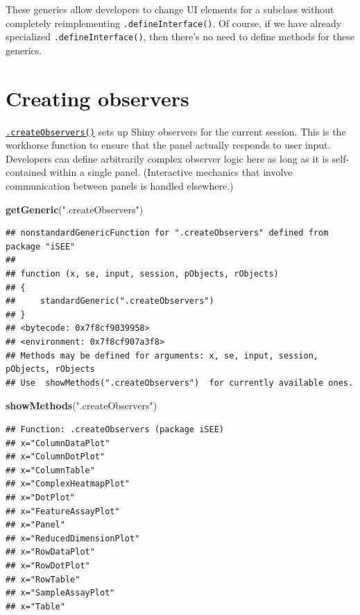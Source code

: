 \documentclass[
]{book}
\newenvironment{Shaded}{\begin{snugshade}}{\end{snugshade}}
\newcommand{\KeywordTok}[1]{\textcolor[rgb]{0.13,0.29,0.53}{\textbf{#1}}}
\newcommand{\NormalTok}[1]{#1}
\newcommand{\StringTok}[1]{\textcolor[rgb]{0.31,0.60,0.02}{#1}}
\begin{document}
These generics allow developers to change UI elements for a subclass without completely reimplementing \texttt{.defineInterface()}.
Of course, if we have already specialized \texttt{.defineInterface()}, then there's no need to define methods for these generics.

\hypertarget{creating-observers}{%
\section{Creating observers}\label{creating-observers}}

\href{https://isee.github.io/iSEE/reference/observer-generics.html}{\texttt{.createObservers()}} sets up Shiny observers for the current session.
This is the workhorse function to ensure that the panel actually responds to user input.
Developers can define arbitrarily complex observer logic here as long as it is self-contained within a single panel.
(Interactive mechanics that involve communication between panels is handled elsewhere.)

\begin{Shaded}
\begin{Highlighting}[]
\KeywordTok{getGeneric}\NormalTok{(}\StringTok{".createObservers"}\NormalTok{)}
\end{Highlighting}
\end{Shaded}

\begin{verbatim}
## nonstandardGenericFunction for ".createObservers" defined from package "iSEE"
## 
## function (x, se, input, session, pObjects, rObjects) 
## {
##     standardGeneric(".createObservers")
## }
## <bytecode: 0x7f8cf9039958>
## <environment: 0x7f8cf907a3f8>
## Methods may be defined for arguments: x, se, input, session, pObjects, rObjects
## Use  showMethods(".createObservers")  for currently available ones.
\end{verbatim}

\begin{Shaded}
\begin{Highlighting}[]
\KeywordTok{showMethods}\NormalTok{(}\StringTok{".createObservers"}\NormalTok{)}
\end{Highlighting}
\end{Shaded}

\begin{verbatim}
## Function: .createObservers (package iSEE)
## x="ColumnDataPlot"
## x="ColumnDotPlot"
## x="ColumnTable"
## x="ComplexHeatmapPlot"
## x="DotPlot"
## x="FeatureAssayPlot"
## x="Panel"
## x="ReducedDimensionPlot"
## x="RowDataPlot"
## x="RowDotPlot"
## x="RowTable"
## x="SampleAssayPlot"
## x="Table"
\end{verbatim}
\end{document}
